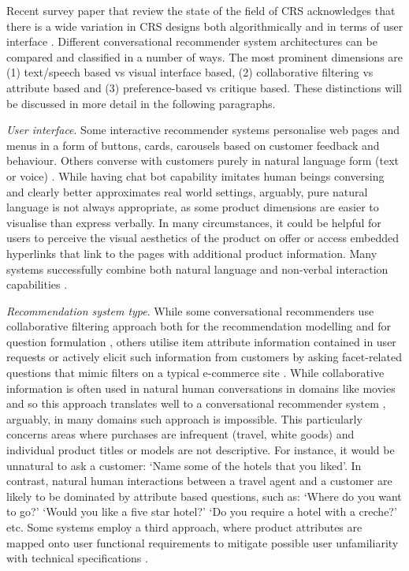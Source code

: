 Recent survey paper that review the state of the field of CRS acknowledges that there is a wide variation in CRS designs both algorithmically and in terms of user interface \citep{jannach2021survey, pramod2022conversational}. Different conversational recommender system architectures can be compared and classified in a number of ways. The most prominent dimensions are (1) text/speech based vs visual interface based, (2) collaborative filtering vs attribute based and (3) preference-based vs critique based. These distinctions will be discussed in more detail in the following paragraphs.

\textit{User interface}. Some interactive recommender systems personalise web pages \citep{mahmood2014dynamic} and menus in a form of buttons, cards, carousels \citep{ayundhita2019ontology, dalton2018vote} based on customer feedback and behaviour. Others converse with customers purely in natural language form (text or voice) \citep{dalton2018vote} . While having chat bot capability imitates human beings conversing and clearly better approximates real world settings, arguably, pure natural language is not always appropriate, as some product dimensions are easier to visualise than express verbally. In many circumstances, it could be helpful for users to perceive the visual aesthetics of the product on offer or access embedded hyperlinks that link to the pages with additional product information. Many systems successfully combine both natural language and non-verbal interaction capabilities \citep{dalton2018vote}.

\textit{Recommendation system type}. While some conversational recommenders use collaborative filtering approach both for the recommendation modelling and for question formulation \citep{dalton2018vote, zhao2013interactive}, others utilise item attribute information contained in user requests \citep{mahmood2014dynamic, warnestaal2005modeling} or actively elicit such information from customers by asking facet-related questions that mimic filters on a typical e-commerce site \citep{sun2018conversational}. While collaborative information is often used in natural human conversations in domains like movies and so this approach translates well to a conversational recommender system \citep{warnestaal2005modeling}, arguably, in many domains such approach is impossible. This particularly concerns areas where purchases are infrequent (travel, white goods) and individual product titles or models are not descriptive. For instance, it would be unnatural to ask a customer: ‘Name some of the hotels that you liked’. In contrast, natural human interactions between a travel agent and a customer are likely to be dominated by attribute based questions, such as: ‘Where do you want to go?’ ‘Would you like a five star hotel?’ ‘Do you require a hotel with a creche?’ etc. Some systems employ a third approach, where product attributes are mapped onto user functional requirements to mitigate possible user unfamiliarity with technical specifications \citep{ayundhita2019ontology}.

